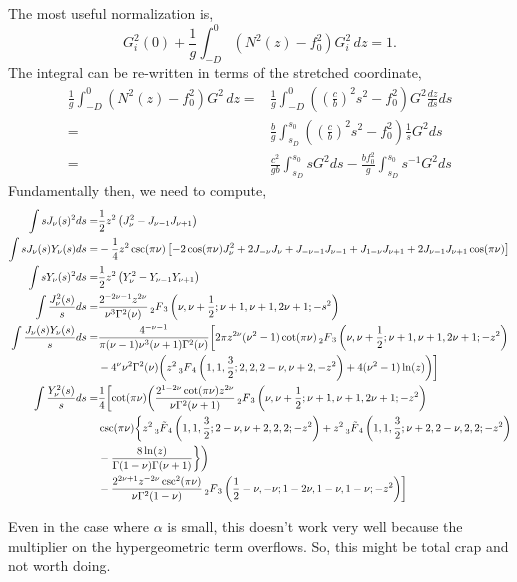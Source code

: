 \documentclass[11pt]{article}
\begin{document}
The most useful normalization is,
\begin{equation}
\label{k_const_norm}
G_i^2(0)+\frac{1}{g} \int_{-D}^{0} (N^2(z)-f_0^2) G_i^2 \, dz = 1 \tag{$K$-constant norm}.
\end{equation}
The integral can be re-written in terms of the stretched coordinate,
\begin{align}
\frac{1}{g} \int_{-D}^{0} (N^2(z)-f_0^2) G^2 \, dz =& \frac{1}{g} \int_{-D}^{0} \left(\left(\frac{c}{b}\right)^2 s^2 -f_0^2\right) G^2 \frac{dz}{ds}ds \\
=& \frac{b}{g} \int_{s_D}^{s_0}  \left(\left(\frac{c}{b}\right)^2 s^2 -f_0^2\right) \frac{1}{s} G^2 ds \\
=& \frac{c^2}{g b} \int_{s_D}^{s_0}  s G^2 ds - \frac{b f_0^2}{g} \int_{s_D}^{s_0}  s^{-1} G^2 ds
\end{align}
Fundamentally then, we need to compute,
\begin{align}
\int s J_\nu(s)^2 ds =& \frac{1}{2} z^2 \left( J_\nu^2 - J_{\nu-1} J_{\nu+1} \right) \\
\int s J_\nu(s) Y_\nu(s) ds =& - \frac{1}{4} z^2 \csc(\pi \nu) \left[ -2 \cos(\pi \nu) J_\nu^2 + 2 J_{-\nu} J_{\nu} + J_{-\nu-1}J_{\nu-1}+J_{1-\nu}J_{\nu+1}+2J_{\nu-1}J_{\nu+1}\cos(\pi\nu) \right]\\
\int s Y_\nu(s)^2 ds =&  \frac{1}{2} z^2 \left( Y_\nu^2 - Y_{\nu-1} Y_{\nu+1} \right) \\
\int  \frac{J_\nu^2(s)}{s} ds =& \frac{2^{-2\nu-1} z^{2\nu}}{\nu^3 \Gamma^2(\nu)} \prescript{}{2}{F}_3 \left(\nu,\nu+\frac{1}{2}; \nu+1,\nu+1,2\nu+1; -s^2 \right)  \\ \nonumber
\int  \frac{J_\nu(s) Y_\nu(s)}{s} ds =& \frac{4^{-\nu-1}}{\pi(\nu-1)\nu^3(\nu+1)\Gamma^2(\nu)} \biggl[   2\pi z^{2\nu} (\nu^2-1) \cot(\pi \nu) \prescript{}{2}{F}_3 \left(\nu,\nu+\frac{1}{2};\nu+1,\nu+1,2\nu+1;-z^2 \right) \\ \nonumber
& -4^\nu \nu^2 \Gamma^2(\nu) \biggl( z^2 \prescript{}{3}{F}_4 \left(1,1,\frac{3}{2};2,2,2-\nu,\nu+2,-z^2 \right) + 4(\nu^2-1)\ln(z) \biggr) \biggr] \\ \nonumber
\int  \frac{Y_\nu^2(s)}{s} ds =& \frac{1}{4} \biggl[ \cot(\pi \nu) \biggl( \frac{2^{1-2\nu} \cot(\pi \nu) z^{2\nu}}{\nu \Gamma^2(\nu+1)}  \prescript{}{2}{F}_3 \left(\nu,\nu+\frac{1}{2};\nu+1,\nu+1,2\nu+1;-z^2 \right) \\ \nonumber
&\csc(\pi \nu) \biggl\{ z^2 \prescript{}{3}{\tilde{F}}_4 \left(1,1,\frac{3}{2};2-\nu,\nu+2,2,2;-z^2 \right)  + z^2 \prescript{}{3}{\tilde{F}}_4 \left(1,1,\frac{3}{2};\nu+2,2-\nu,2,2;-z^2 \right)  \\ \nonumber
& - \frac{8 \ln(z)}{\Gamma(1-\nu) \Gamma(\nu+1)}  \biggr\} \biggr) \\ \nonumber
& - \frac{2^{2\nu+1} z^{-2\nu} \csc^2 (\pi \nu) }{\nu \Gamma^2(1-\nu)} \prescript{}{2}{F}_3 \left(\frac{1}{2}-\nu,-\nu;1-2\nu,1-\nu,1-\nu;-z^2 \right) \biggr]
\end{align}

Even in the case where $\alpha$ is small, this doesn't work very well because the multiplier on the hypergeometric term overflows. So, this might be total crap and not worth doing.
\end{document}
